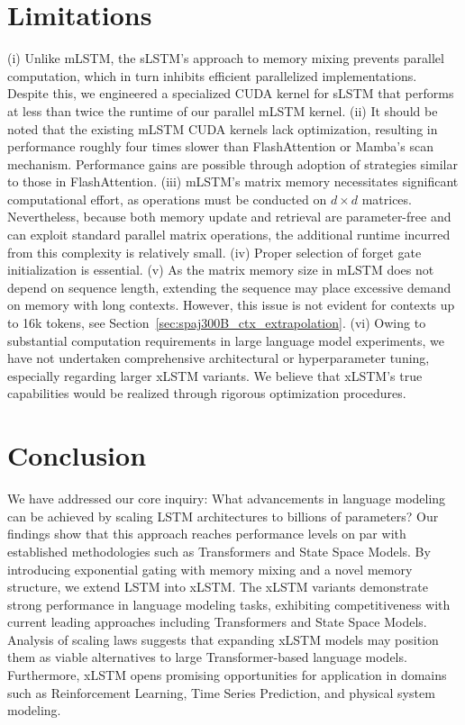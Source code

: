 \section{Limitations}

(i) Unlike mLSTM, the sLSTM's approach to memory mixing prevents parallel computation, which in turn inhibits efficient parallelized implementations. Despite this, we engineered a specialized CUDA kernel for sLSTM that performs at less than twice the runtime of our parallel mLSTM kernel. (ii) It should be noted that the existing mLSTM CUDA kernels lack optimization, resulting in performance roughly four times slower than FlashAttention or Mamba’s scan mechanism. Performance gains are possible through adoption of strategies similar to those in FlashAttention. (iii) mLSTM's matrix memory necessitates significant computational effort, as operations must be conducted on $d \times d$ matrices. Nevertheless, because both memory update and retrieval are parameter-free and can exploit standard parallel matrix operations, the additional runtime incurred from this complexity is relatively small. (iv) Proper selection of forget gate initialization is essential. (v) As the matrix memory size in mLSTM does not depend on sequence length, extending the sequence may place excessive demand on memory with long contexts. However, this issue is not evident for contexts up to 16k tokens, see Section~\ref{sec:spaj300B_ctx_extrapolation}. (vi) Owing to substantial computation requirements in large language model experiments, we have not undertaken comprehensive architectural or hyperparameter tuning, especially regarding larger xLSTM variants. We believe that xLSTM's true capabilities would be realized through rigorous optimization procedures.

\section{Conclusion}
We have addressed our core inquiry: What advancements in language modeling can be achieved by scaling LSTM architectures to billions of parameters? Our findings show that this approach reaches performance levels on par with established methodologies such as Transformers and State Space Models. By introducing exponential gating with memory mixing and a novel memory structure, we extend LSTM into xLSTM. The xLSTM variants demonstrate strong performance in language modeling tasks, exhibiting competitiveness with current leading approaches including Transformers and State Space Models. Analysis of scaling laws suggests that expanding xLSTM models may position them as viable alternatives to large Transformer-based language models. Furthermore, xLSTM opens promising opportunities for application in domains such as Reinforcement Learning, Time Series Prediction, and physical system modeling.

